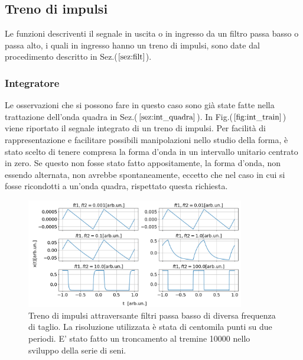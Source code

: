 \documentclass{article}
\begin{document}
    \subsection{Treno di impulsi}
    Le funzioni descriventi il segnale in uscita o in ingresso da un filtro passa basso
    o passa alto, i quali in ingresso hanno un treno di impulsi, 
    sono date dal procedimento descritto in Sez.($\ref{sez:filt}$).
  
            \subsubsection{Integratore}
            Le osservazioni che si possono fare in questo caso sono già state fatte 
            nella trattazione dell'onda quadra in Sez.($\ref{sez:int_quadra}$).
            In Fig.($\ref{fig:int_train}$) viene riportato il segnale integrato di un treno di impulsi.
                Per facilità di rappresentazione e facilitare possibili manipolazioni
                nello studio della forma, è stato scelto di tenere compresa la forma 
                d'onda in un intervallo unitario centrato in zero.
                Se questo non fosse stato fatto appositamente, la forma d'onda, non 
                essendo alternata, non avrebbe spontaneamente, eccetto che nel caso 
                in cui si fosse ricondotti a un'onda quadra, rispettato questa richiesta.
        
                    \begin{figure}[H]
                        \centering
                        \includegraphics[width=0.85\textwidth]{int_train1.png} %
                        \caption{Treno di impulsi attraversante filtri passa basso di diversa frequenza di taglio.
                        La risoluzione utilizzata è stata di centomila punti su due periodi.
                        E' stato fatto un troncamento al tremine 10000
                        nello sviluppo della serie di seni.}
                        \label{fig:int_train}
                    \end{figure}               
\end{document}
